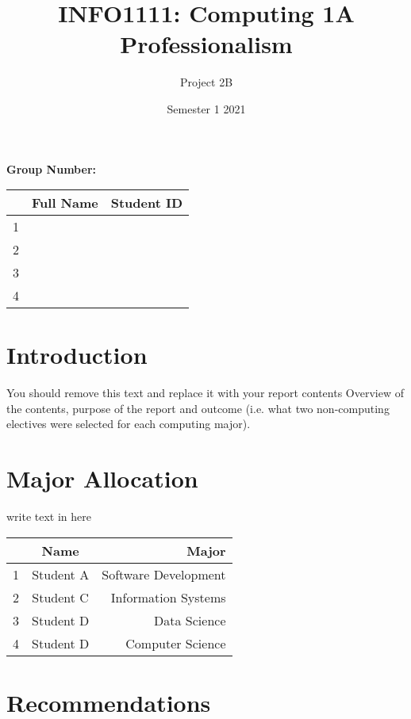 \documentclass{article}
\title{INFO1111: Computing 1A Professionalism}
\date{Semester 1 2021}
\author{Project 2B}
\begin{document}
\maketitle

\begin{center}
    \textbf{Group Number:}
\end{center}

\begin{center}
\begin{tabular}{|l|c|r|}
\hline
  & Full Name & Student ID \\ \hline
1 &           &            \\ \hline
2 &           &            \\ \hline
3 &           &            \\ \hline
4 &           &            \\ \hline    
\end{tabular}
\end{center}
\thispagestyle{empty}
\newpage

\setcounter{page}{1}
\section{Introduction}
You should remove this text and replace it with your report contents
Overview of the contents, purpose of the report and outcome (i.e. what two non-computing electives were selected for each computing major).


\section{Major Allocation}
write text in here
\begin{center}
\begin{tabular}{|l|c|r|}
\hline
  & Name      & Major                \\ \hline
1 & Student A & Software Development \\ \hline
2 & Student C & Information Systems  \\ \hline
3 & Student D & Data Science         \\ \hline
4 & Student D & Computer Science     \\ \hline
\end{tabular}
\end{center}

\section{Recommendations}
\end{document}
